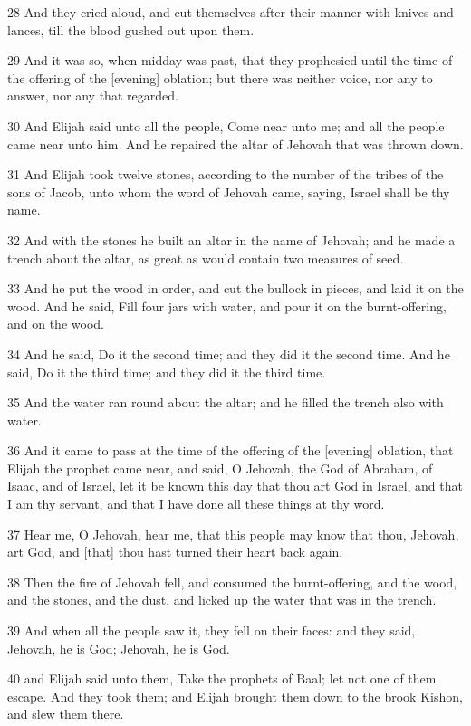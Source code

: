 \par 28 And they cried aloud, and cut themselves after their manner with knives and lances, till the blood gushed out upon them.
\par 29 And it was so, when midday was past, that they prophesied until the time of the offering of the [evening] oblation; but there was neither voice, nor any to answer, nor any that regarded.
\par 30 And Elijah said unto all the people, Come near unto me; and all the people came near unto him. And he repaired the altar of Jehovah that was thrown down.
\par 31 And Elijah took twelve stones, according to the number of the tribes of the sons of Jacob, unto whom the word of Jehovah came, saying, Israel shall be thy name.
\par 32 And with the stones he built an altar in the name of Jehovah; and he made a trench about the altar, as great as would contain two measures of seed.
\par 33 And he put the wood in order, and cut the bullock in pieces, and laid it on the wood. And he said, Fill four jars with water, and pour it on the burnt-offering, and on the wood.
\par 34 And he said, Do it the second time; and they did it the second time. And he said, Do it the third time; and they did it the third time.
\par 35 And the water ran round about the altar; and he filled the trench also with water.
\par 36 And it came to pass at the time of the offering of the [evening] oblation, that Elijah the prophet came near, and said, O Jehovah, the God of Abraham, of Isaac, and of Israel, let it be known this day that thou art God in Israel, and that I am thy servant, and that I have done all these things at thy word.
\par 37 Hear me, O Jehovah, hear me, that this people may know that thou, Jehovah, art God, and [that] thou hast turned their heart back again.
\par 38 Then the fire of Jehovah fell, and consumed the burnt-offering, and the wood, and the stones, and the dust, and licked up the water that was in the trench.
\par 39 And when all the people saw it, they fell on their faces: and they said, Jehovah, he is God; Jehovah, he is God.
\par 40 and Elijah said unto them, Take the prophets of Baal; let not one of them escape. And they took them; and Elijah brought them down to the brook Kishon, and slew them there.
